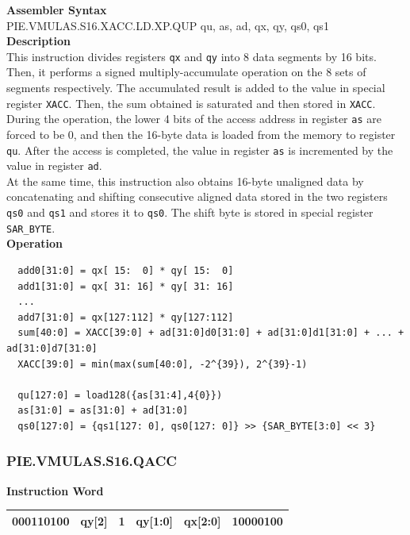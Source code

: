 \textbf{Assembler Syntax} \\
PIE.VMULAS.S16.XACC.LD.XP.QUP qu, as, ad, qx, qy, qs0, qs1 \\
\textbf{Description} \\
This instruction divides registers \lstinline{qx} and \lstinline{qy} into 8 data segments by 16 bits. Then, it performs a signed multiply-accumulate operation on the 8 sets of segments respectively. The accumulated result is added to the value in special register \lstinline{XACC}. Then, the sum obtained is saturated and then stored in \lstinline{XACC}.\\
During the operation, the lower 4 bits of the access address in register \lstinline{as} are forced to be 0, and then the 16-byte data is loaded from the memory to register \lstinline{qu}. After the access is completed, the value in register \lstinline{as} is incremented by the value in register \lstinline{ad}.\\
At the same time, this instruction also obtains 16-byte unaligned data by concatenating and shifting consecutive aligned data stored in the two registers \lstinline{qs0} and \lstinline{qs1} and stores it to \lstinline{qs0}. The shift byte is stored in special register \lstinline{SAR_BYTE}.\\
\textbf{Operation}
\begin{lstlisting}
  add0[31:0] = qx[ 15:  0] * qy[ 15:  0]
  add1[31:0] = qx[ 31: 16] * qy[ 31: 16]
  ...
  add7[31:0] = qx[127:112] * qy[127:112]
  sum[40:0] = XACC[39:0] + ad[31:0]d0[31:0] + ad[31:0]d1[31:0] + ... + ad[31:0]d7[31:0]
  XACC[39:0] = min(max(sum[40:0], -2^{39}), 2^{39}-1)

  qu[127:0] = load128({as[31:4],4{0}})
  as[31:0] = as[31:0] + ad[31:0]
  qs0[127:0] = {qs1[127: 0], qs0[127: 0]} >> {SAR_BYTE[3:0] << 3}
\end{lstlisting}

\newpage
\subsubsection{PIE.VMULAS.S16.QACC}\label{instruction:PIEVMULASS16QACC}
\setlength\tabcolsep{6pt}
\textbf{Instruction Word} \\
\begin{tabular}{|c|c|c|c|c|c|}
	\hline
	000110100 & qy[2] & 1 & qy[1:0] & qx[2:0] & 10000100 \\
	\hline
\end{tabular}

